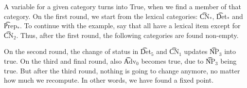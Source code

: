 \begin{EmptyItem}
\begin{Highlighting}[]
  \OtherTok{::=} \FunctionTok{&&} \FunctionTok{||} \FunctionTok{&&}  \NormalTok{;}
  \OtherTok{::=} \FunctionTok{&&} \FunctionTok{||}  \NormalTok{;}
  \OtherTok{::=} \FunctionTok{&&}  \NormalTok{;}
  \OtherTok{::=} \FunctionTok{&&}  \NormalTok{;}
  \OtherTok{::=} \FunctionTok{&&}  \NormalTok{;}
  \OtherTok{::=}  \NormalTok{;}
  \OtherTok{::=}  \NormalTok{;}
  \OtherTok{::=}  \NormalTok{;}
\end{Highlighting}
\end{EmptyItem}

A variable for a given category turns into True, when we find a member
of that category. On the first round, we start from the lexical
categories: \t{CN$_\text{*}$}, \t{Det$_*$} and \t{Prep$_*$}. To
continue with the example, say that all have a lexical item except for
\t{CN$_\text{2}$}. Thus, after the first round, the following
categories are found non-empty.

\begin{EmptyItem}
\begin{Highlighting}[]
  \OtherTok{::=} \FunctionTok{&&} \FunctionTok{||} \FunctionTok{&&}  \NormalTok{;}
  \OtherTok{::=} \FunctionTok{&&} \FunctionTok{||}  \NormalTok{;}
  \OtherTok{::=} \FunctionTok{&&}  \NormalTok{;}
  \OtherTok{::=} \FunctionTok{&&}  \NormalTok{;}
  \OtherTok{::=} \FunctionTok{&&}  \NormalTok{;}
  \OtherTok{::=}  \NormalTok{;}
  \OtherTok{::=}  \NormalTok{;}
  \OtherTok{::=}  \NormalTok{;}
\end{Highlighting}
\end{EmptyItem}


On the second round, the change of status in \t{Det$_\text{5}$} and \t{CN$_\text{1}$} updates \t{NP$_\text{3}$} into true. On the third and final round, also  \t{Adv$_\text{0}$} becomes true, due to \t{NP$_\text{3}$} being true. But after the third round, nothing is going to change anymore, no matter how much we recompute. In other words, we have found a fixed point.


